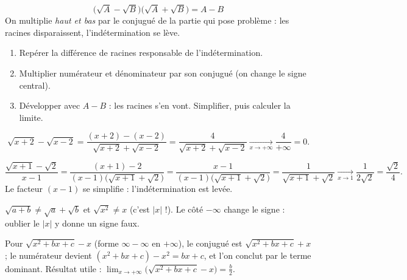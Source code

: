 \documentclass[11pt,a4paper]{article}
\begin{document}
\begin{idee}
\[ \boxed{\ \bigl(\sqrt{A}-\sqrt{B}\bigr)\bigl(\sqrt{A}+\sqrt{B}\bigr)=A-B\ } \]
On multiplie \emph{haut et bas} par le conjugué de la partie qui pose problème : les racines
disparaissent, l'indétermination se lève.
\end{idee}

\begin{methode}
\begin{enumerate}[leftmargin=1.9em,topsep=2pt,itemsep=1pt]
  \item Repérer la différence de racines responsable de l'indétermination.
  \item Multiplier numérateur et dénominateur par son conjugué (on change le signe central).
  \item Développer avec $A-B$ : les racines s'en vont. Simplifier, puis calculer la limite.
\end{enumerate}
\end{methode}

\begin{exemple}
\[ \sqrt{x+2}-\sqrt{x-2}
   =\frac{(x+2)-(x-2)}{\sqrt{x+2}+\sqrt{x-2}}=\frac{4}{\sqrt{x+2}+\sqrt{x-2}}\xrightarrow[x\to+\infty]{}\frac{4}{+\infty}=0. \]
\end{exemple}

\begin{exemple}
\[ \frac{\sqrt{x+1}-\sqrt2}{x-1}
  =\frac{(x+1)-2}{(x-1)\bigl(\sqrt{x+1}+\sqrt2\bigr)}
  =\frac{x-1}{(x-1)\bigl(\sqrt{x+1}+\sqrt2\bigr)}
  =\frac{1}{\sqrt{x+1}+\sqrt2}\xrightarrow[x\to1]{}\frac{1}{2\sqrt2}=\frac{\sqrt2}{4}. \]
Le facteur $(x-1)$ se simplifie : l'indétermination est levée.
\end{exemple}

\begin{attention}
$\sqrt{a+b}\neq\sqrt{a}+\sqrt{b}$ et $\sqrt{x^2}\neq x$ (c'est $|x|$ !). Le côté $-\infty$ change le
signe : oublier le $|x|$ y donne un signe faux.
\end{attention}

\begin{astuce}
Pour $\sqrt{x^2+bx+c}-x$ (forme $\infty-\infty$ en $+\infty$), le conjugué est $\sqrt{x^2+bx+c}+x$ ;
le numérateur devient $(x^2+bx+c)-x^2=bx+c$, et l'on conclut par le terme dominant. Résultat utile :
$\displaystyle\lim_{x\to+\infty}\bigl(\sqrt{x^2+bx+c}-x\bigr)=\frac{b}{2}$.
\end{astuce}
\end{document}
